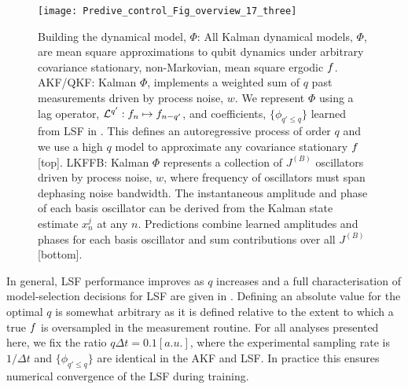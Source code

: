 \begin{figure} [tp]
    \texttt{[image: Predive\_control\_Fig\_overview\_17\_three]}
    \caption{\label{Predive_control_Fig_overview_17_three} Building the dynamical model, $\Phi$: All Kalman dynamical models, $\Phi$, are mean square approximations to qubit dynamics under arbitrary covariance stationary, non-Markovian, mean square ergodic $f$. AKF/QKF: Kalman $\Phi$, implements a weighted sum of $q$ past measurements driven by process noise, $w$. We represent $\Phi$ using a lag operator, $\mathcal{L}^{q'}: f_n \mapsto f_{n-q'}$, and coefficients, $ \{ \phi_{q' \leq q} \}$ learned from LSF in \cite{mavadia2017}. This defines an autoregressive process of order $q$ and we use a high $q$ model to approximate any covariance stationary $f$ [top]. LKFFB: Kalman $\Phi$ represents a collection of $J^{(B)}$ oscillators driven by process noise, $w$, where frequency of oscillators must span dephasing noise bandwidth. The instantaneous amplitude and phase of each basis oscillator can be derived from the Kalman state estimate $x^j_n$ at any $n$. Predictions combine learned amplitudes and phases for each basis oscillator and sum contributions over all $J^{(B)}$ [bottom].}
\end{figure}

In general, LSF performance improves as $q$ increases and a full characterisation of model-selection decisions for LSF are given in \cite{mavadia2017}. Defining an absolute value for the optimal $q$ is somewhat arbitrary as it is defined relative to the extent to which a true $f$ is oversampled in the measurement routine. For all analyses presented here, we fix the ratio $q \Delta t = 0.1 [a.u.]$, where the experimental sampling rate is $1/\Delta t$ and $\{\phi_{q' \leq q}\}$ are identical in the AKF and LSF.   In practice this ensures numerical convergence of the LSF during training.

